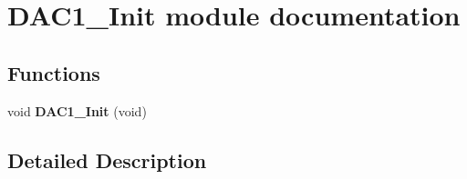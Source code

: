\hypertarget{group___d_a_c1___init__module}{}\section{D\+A\+C1\+\_\+\+Init module documentation}
\label{group___d_a_c1___init__module}
\subsection*{Functions}
\begin{DoxyCompactItemize}
\item 
void {\bfseries D\+A\+C1\+\_\+\+Init} (void)\hypertarget{group___d_a_c1___init__module_ga7696d9e8e02af9a677d4804be002d89b}{}\label{group___d_a_c1___init__module_ga7696d9e8e02af9a677d4804be002d89b}

\end{DoxyCompactItemize}


\subsection{Detailed Description}
